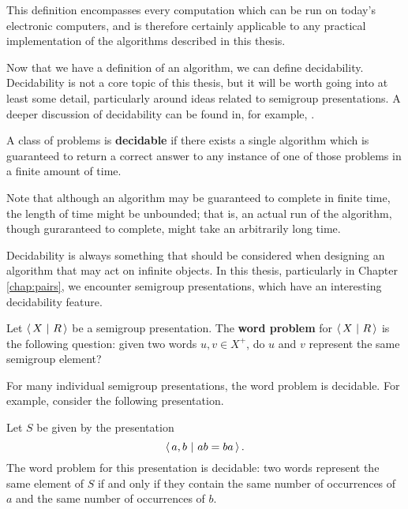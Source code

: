 This definition encompasses every computation which can be run on today's
electronic computers, and is therefore certainly applicable to any practical
implementation of the algorithms described in this thesis.

Now that we have a definition of an algorithm, we can define decidability.
Decidability is not a core topic of this thesis, but it will be worth going into
at least some detail, particularly around ideas related to semigroup
presentations.  A deeper discussion of decidability can be found in, for
example, \cite{enderton_2001}.

\begin{definition}
  \label{def:decidable}
  A class of problems is \textbf{decidable} if there exists a single algorithm
  which is guaranteed to return a correct answer to any instance of one of those
  problems in a finite amount of time.
\end{definition}

Note that although an algorithm may be guaranteed to complete in finite time,
the length of time might be unbounded; that is, an actual run of the algorithm,
though guraranteed to complete, might take an arbitrarily long time.

Decidability is always something that should be considered when designing an
algorithm that may act on infinite objects.  In this thesis, particularly in
Chapter \ref{chap:pairs}, we encounter semigroup presentations, which have an
interesting decidability feature.

\begin{definition}
  \label{def:word-problem}
  Let $\left\langle\,X ~\middle|~ R\,\right\rangle$ be a semigroup presentation.  The \textbf{word problem} for
  $\left\langle\,X ~\middle|~ R\,\right\rangle$ is the following question: given two words $u, v \in X^+$, do $u$
  and $v$ represent the same semigroup element?
\end{definition}

For many individual semigroup presentations, the word problem is decidable.  For
example, consider the following presentation.

\begin{example}
  \label{ex:presentation-decidable}
  Let $S$ be given by the presentation
  $$\left\langle\,a,b ~\middle|~ ab=ba\,\right\rangle.$$
  The word problem for this presentation is decidable: two words represent the
  same element of $S$ if and only if they contain the same number of occurrences
  of $a$ and the same number of occurrences of $b$.
\end{example}

